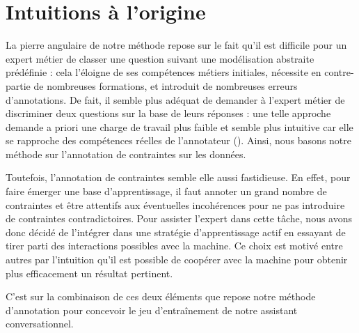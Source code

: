 	\minitoc


	\section{Intuitions à l'origine}
	\label{section:3.1-DESCRIPTION-INTUITIONS}

		La pierre angulaire de notre méthode repose sur le fait qu'il est difficile pour un expert métier de classer une question suivant une modélisation abstraite prédéfinie :
		cela l'éloigne de ses compétences métiers initiales, nécessite en contre-partie de nombreuses formations, et introduit de nombreuses erreurs d'annotations.
		De fait, il semble plus adéquat de demander à l'expert métier de discriminer deux questions sur la base de leurs réponses :
		une telle approche demande a priori une charge de travail plus faible et semble plus intuitive car elle se rapproche des compétences réelles de l'annotateur ().
		Ainsi, nous basons notre méthode sur l'annotation de contraintes sur les données.
		
		Toutefois, l'annotation de contraintes semble elle aussi fastidieuse.
		En effet, pour faire émerger une base d'apprentissage, il faut annoter un grand nombre de contraintes et être attentifs aux éventuelles incohérences pour ne pas introduire de contraintes contradictoires.
		Pour assister l'expert dans cette tâche, nous avons donc décidé de l'intégrer dans une stratégie d'apprentissage actif en essayant de tirer parti des interactions possibles avec la machine.
		Ce choix est motivé entre autres par l'intuition qu'il est possible de coopérer avec la machine pour obtenir plus efficacement un résultat pertinent.

		C'est sur la combinaison de ces deux éléments que repose notre méthode d'annotation pour concevoir le jeu d’entraînement de notre assistant conversationnel.


